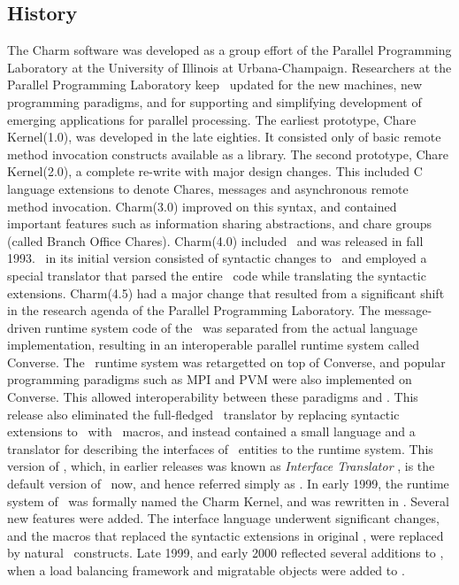 \subsection{History}

The {\sc Charm} software was developed as a group effort of the Parallel
Programming Laboratory at the University of Illinois at Urbana-Champaign.
Researchers at the Parallel Programming Laboratory keep \charmpp\ updated for
the new machines, new programming paradigms, and for supporting and simplifying
development of emerging applications for parallel processing.  The earliest
prototype, Chare Kernel(1.0), was developed in the late eighties. It consisted
only of basic remote method invocation constructs available as a library.  The
second prototype, Chare Kernel(2.0), a complete re-write with major design
changes.  This included C language extensions to denote Chares, messages and
asynchronous remote method invocation.  {\sc Charm}(3.0) improved on this
syntax, and contained important features such as information sharing
abstractions, and chare groups (called Branch Office Chares).  {\sc Charm}(4.0)
included \charmpp\ and was released in fall 1993.  \charmpp\ in its initial
version consisted of syntactic changes to \CC\ and employed a special
translator that parsed the entire \CC\ code while translating the syntactic
extensions.  {\sc Charm}(4.5)  had a major change that resulted from a
significant shift in the research agenda of the Parallel Programming
Laboratory. The message-driven runtime system code of the \charmpp\ was
separated from the actual language implementation, resulting in an
interoperable parallel runtime system called {\sc
Converse}. The \charmpp\ runtime system was
retargetted on top of {\sc Converse}, and popular programming paradigms such as
MPI and PVM were also implemented on {\sc Converse}. This allowed
interoperability between these paradigms and \charmpp. This release also
eliminated the full-fledged \charmpp\ translator by replacing syntactic
extensions to \CC\ with \CC\ macros, and instead contained a small language and
a translator for describing the interfaces of \charmpp\ entities to the runtime
system.  This version of \charmpp, which, in earlier releases was known as {\em
Interface Translator \charmpp}, is the default version of \charmpp\ now, and
hence referred simply as {\bf \charmpp}.  In early 1999, the runtime system of
\charmpp\ was formally named the Charm Kernel, and was rewritten in \CC.
Several new features were added. The interface language underwent significant
changes, and the macros that replaced the syntactic extensions in original
\charmpp, were replaced by natural \CC\ constructs. Late 1999, and early
2000 reflected several additions to \charmpp{}, when a load balancing
framework and migratable objects were added to \charmpp{}.
